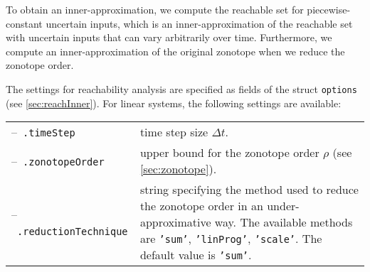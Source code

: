 \newpage


To obtain an inner-approximation, we compute the reachable set for piecewise-constant uncertain inputs, which is an inner-approximation of the reachable set with uncertain inputs that can vary arbitrarily over time. Furthermore, we compute an inner-approximation of the original zonotope when we reduce the zonotope order. 

The settings for reachability analysis are specified as fields of the struct \texttt{options} (see \cref{sec:reachInner}). For linear systems, the following settings are available:

\begin{center}
\renewcommand{\arraystretch}{1.3}
\begin{tabular}[t]{l p{11cm}}	
	--~\texttt{.timeStep} & time step size $\Delta t$. \\
	--~\texttt{.zonotopeOrder} & upper bound for the zonotope order $\rho$ (see \cref{sec:zonotope}). \\
	--~\texttt{.reductionTechnique} & string specifying the method used to reduce the zonotope order in an under-approximative way. The available methods are \texttt{'sum'}, \texttt{'linProg'}, \texttt{'scale'}. The default value is \texttt{'sum'}. \\
\end{tabular}
\end{center}